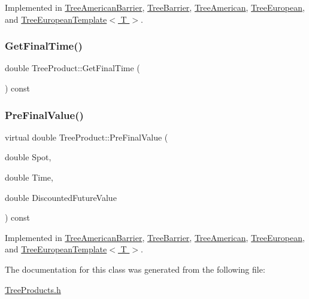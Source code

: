 Implemented in \hyperlink{classTreeAmericanBarrier_a55218e00428e49c18186358ae1b54b58}{Tree\+American\+Barrier}, \hyperlink{classTreeBarrier_a920dcdcf9a3b00f6a83c13fbe51b5b8a}{Tree\+Barrier}, \hyperlink{classTreeAmerican_ad3a967025c3355fdce85f5d28afcc302}{Tree\+American}, \hyperlink{classTreeEuropean_aaffa40394d1021120a87dfa8e176c321}{Tree\+European}, and \hyperlink{classTreeEuropeanTemplate_a20fe052329fc532eb24931a4e7e20a63}{Tree\+European\+Template$<$ T $>$}.

\hypertarget{classTreeProduct_ad8ae61f333f08e7a9f2e24e3611263f9}{}\label{classTreeProduct_ad8ae61f333f08e7a9f2e24e3611263f9} 
\subsubsection{\texorpdfstring{Get\+Final\+Time()}{GetFinalTime()}}
{\footnotesize\ttfamily double Tree\+Product\+::\+Get\+Final\+Time (\begin{DoxyParamCaption}{ }\end{DoxyParamCaption}) const}

\hypertarget{classTreeProduct_a0b58b8acdd3759f55212c1c65361056e}{}\label{classTreeProduct_a0b58b8acdd3759f55212c1c65361056e} 
\subsubsection{\texorpdfstring{Pre\+Final\+Value()}{PreFinalValue()}}
{\footnotesize\ttfamily virtual double Tree\+Product\+::\+Pre\+Final\+Value (\begin{DoxyParamCaption}\item[{double}]{Spot,  }\item[{double}]{Time,  }\item[{double}]{Discounted\+Future\+Value }\end{DoxyParamCaption}) const\hspace{0.3cm}{\ttfamily [pure virtual]}}



Implemented in \hyperlink{classTreeAmericanBarrier_a66ac7ef18f10dbc5232b7c18e3093805}{Tree\+American\+Barrier}, \hyperlink{classTreeBarrier_a507840c03551ece81bae4a97d342a368}{Tree\+Barrier}, \hyperlink{classTreeAmerican_aac1d79d79a45a83a06cdbaaf9d80018e}{Tree\+American}, \hyperlink{classTreeEuropean_a555787d536320f1d9ce776da1c785058}{Tree\+European}, and \hyperlink{classTreeEuropeanTemplate_a09419e2ce4ef3564661a45440ed24882}{Tree\+European\+Template$<$ T $>$}.



The documentation for this class was generated from the following file\+:\begin{DoxyCompactItemize}
\item 
\hyperlink{TreeProducts_8h}{Tree\+Products.\+h}\end{DoxyCompactItemize}
